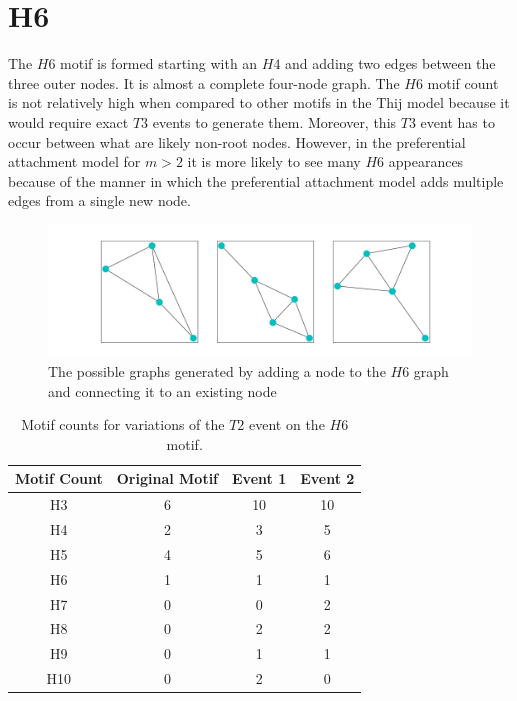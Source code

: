 \section{H6}
The $H6$ motif is formed starting with an $H4$ and adding two edges between the three outer nodes. It is 
almost a complete four-node graph. 
The $H6$ motif count is not relatively high when compared to other motifs in the Thij
model because it would require exact $T3$ events to generate them. Moreover, this
$T3$ event has to occur between what are likely non-root nodes. However, in the preferential attachment model for $m>2$
it is more likely to see many $H6$ appearances because of the manner in which 
the preferential attachment model adds multiple edges from a single new node.

\begin{figure}[!ht]
    \includegraphics[width=14cm]{Images/H6_evolution.png}
    \centering
    \caption{The possible graphs generated by adding a node to the $H6$ graph 
    and connecting it to an existing node}
\end{figure}
\FloatBarrier

\begin{table}
    \centering
    \begin{tabular}{||c c c c||} 
    \hline
    Motif Count & Original Motif & Event 1 & Event 2\\ [0.5ex] 
    \hline\hline
    H3 & 6 & 10 & 10\\ 
    \hline
    H4 & 2 & 3 & 5\\
    \hline
    H5 & 4 & 5 & 6\\
    \hline
    H6 & 1 & 1 & 1\\
    \hline
    H7 & 0 & 0 & 2\\
    \hline
    H8 & 0 & 2 & 2\\
    \hline
    H9 & 0 & 1 & 1\\
    \hline
    H10 & 0 & 2 & 0\\
    \hline
   \end{tabular}
   \caption{Motif counts for variations of the $T2$ event on the $H6$ motif.}
    \label{table:4}
\end{table}

